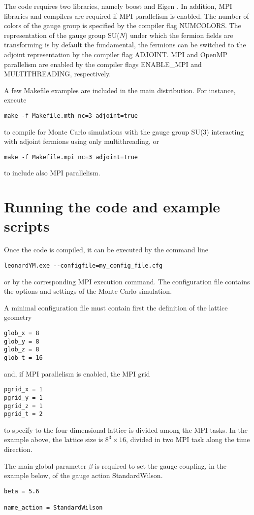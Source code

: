\documentclass[11pt,a4paper]{article}
\begin{document}
The code requires two libraries, namely boost \cite{BOOST} and Eigen \cite{EIGEN}. In addition, MPI libraries and compilers are required if MPI parallelism is enabled. The number of colors of the gauge group is specified by the compiler flag NUMCOLORS. The representation of the gauge group SU($N$) under which the fermion fields are transforming is by default the fundamental, the fermions can be switched to the adjoint representation by the compiler flag ADJOINT. MPI and OpenMP parallelism are enabled by the compiler flags ENABLE\_MPI and MULTITHREADING, respectively. 

A few Makefile examples are included in the main distribution. For instance, execute
\begin{lstlisting}
make -f Makefile.mth nc=3 adjoint=true
\end{lstlisting}
to compile for Monte Carlo simulations with the gauge group SU(3) interacting with adjoint fermions using only multithreading, or 
\begin{lstlisting}
make -f Makefile.mpi nc=3 adjoint=true
\end{lstlisting}
to include also MPI parallelism.

\section{Running the code and example scripts}

Once the code is compiled, it can be executed by the command line
\begin{lstlisting}
leonardYM.exe --configfile=my_config_file.cfg
\end{lstlisting}
or by the corresponding MPI execution command. The configuration file contains the options and settings of the Monte Carlo simulation.

A minimal configuration file must contain first the definition of the lattice geometry
\begin{lstlisting}
glob_x = 8
glob_y = 8
glob_z = 8
glob_t = 16
\end{lstlisting}
and, if MPI parallelism is enabled, the MPI grid
\begin{lstlisting}
pgrid_x = 1
pgrid_y = 1
pgrid_z = 1
pgrid_t = 2
\end{lstlisting}
to specify to the four dimensional lattice is divided among the MPI tasks. In the example above, the lattice size is $8^3\times 16$, divided in two MPI task along the time direction.

The main global parameter $\beta$ is required to set the gauge coupling, in the example below, of the gauge action StandardWilson.
\begin{lstlisting}
beta = 5.6

name_action = StandardWilson
\end{lstlisting}
\end{document}
